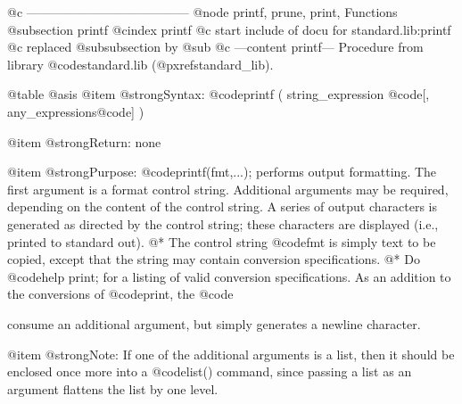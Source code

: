 {{{{{@c ---------------------------------------
@node printf, prune, print, Functions
@subsection printf
@cindex printf
@c start include of docu for standard.lib:printf
@c replaced @subsubsection by @sub
@c ---content printf---
Procedure from library @code{standard.lib} (@pxref{standard_lib}).

@table @asis
@item @strong{Syntax:}
@code{printf (} string_expression @code{[,} any_expressions@code{] )}

@item @strong{Return:}
none

@item @strong{Purpose:}
@code{printf(fmt,...);} performs output formatting. The first
argument is a format control string. Additional arguments may be
required, depending on the content of the control string. A series
of output characters is generated as directed by the control string;
these characters are displayed (i.e., printed to standard out). @*
The control string @code{fmt} is simply text to be copied, except
that the string may contain conversion specifications. @*
Do @code{help print;} for a listing of valid conversion
specifications. As an addition to the conversions of @code{print},
the @code{%
consume an additional argument, but simply generates a newline
character.

@item @strong{Note:}
If one of the additional arguments is a list, then it should be
enclosed once more into a @code{list()} command, since passing a
list as an argument flattens the list by one level.

}}}}}}
